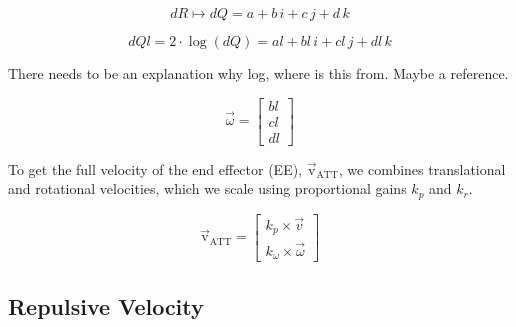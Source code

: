 \documentclass[]{article}
\begin{document}
\begin{equation}
	dR \mapsto dQ = a + b \, i + c \, j + d \, k
	\label{eq: quat_mapsto}
\end{equation}

\begin{equation}
	dQl = 2 \cdot \log(dQ) = al + bl \, i + cl \, j + dl \, k
	\label{eq:quat_log}
\end{equation}

\alert{There needs to be an explanation why log, where is this from. Maybe a reference.}



\begin{equation}
	\vec{\omega} =
	\begin{bmatrix}
		bl \\
		cl \\
		dl
	\end{bmatrix}
	\label{eq:rot_error_vector}
\end{equation}

To get the full velocity of the end effector (EE), \( \mathrm{\vec{v}_{ATT}} \), we combines translational and rotational velocities, which we scale using proportional gains \( k_p \) and \( k_r \).

\begin{equation}
	\mathrm{\vec{v}_{ATT}} = 
	\begin{bmatrix}
		k_p \times \vec{v}   \\
		k_{\omega} \times \vec{\omega}
	\end{bmatrix}
	\label{eq:ee_velocity}
\end{equation}

\subsection{Repulsive Velocity}
\end{document}
